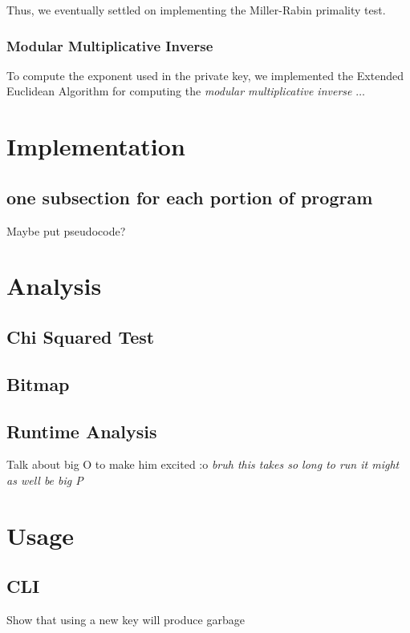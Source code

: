 \documentclass{article}
\begin{document}
Thus, we eventually settled on implementing the Miller-Rabin primality test.

\subsubsection{Modular Multiplicative Inverse}
To compute the exponent used in the private key, we implemented the Extended Euclidean Algorithm for computing the \textit{modular multiplicative inverse} \cite{mmi} $\dots$


\section{Implementation}
\subsection{one subsection for each portion of program}
Maybe put pseudocode?


\section{Analysis}
\subsection{Chi Squared Test}
\subsection{Bitmap}
\subsection{Runtime Analysis}
Talk about big O to make him excited :o \textit{bruh this takes so long to run it might as well be big P}


\section{Usage}
\subsection{CLI}
Show that using a new key will produce garbage
\end{document}
